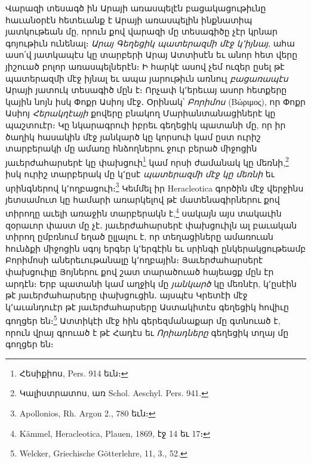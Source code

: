 \documentclass{article}
\begin{document}
{Վարազի տեսագծ ին Արայի առասպելէն բացակացութիւնը հաւանօրէն հետեւանք է Արայի առասպելին ինքնատիպ յատկութեան մը, որուն քով վարազի մը տեսագիծը չէր կրնար գոյութիւն ունենալ։ \emph{Արայ Գեղեցիկ պատերազմի մէջ կ՚իյնայ}, ահա ասո՛վ յատկապէս կը տարբերի Արայ Ատտիսէն եւ անոր հետ վերը յիշուած բոլոր առասպելներէն։ Ի հարկէ ասով չեմ ուզեր ըսել թէ պատերազմի մէջ իյնալ եւ ապա յարութիւն առնուլ \emph{բացառապէս} Արայի յատուկ տեսագիծ մըն է։ Որչափ կ՚երեւայ ասոր հետքերը կային նոյն իսկ Փոքր Ասիոյ մէջ․ Օրինակ՝ \emph{Բորիմոս} (Βώριμος), որ Փոքր Ասիոյ \emph{Հերակղէայի} քովերը բնակող Մարիանտանացիներէ կը պաշտուէր։ Կը նկարագրուի իբրեւ գեղեցիկ պատանի մը, որ իր ծաղիկ հասակին մէջ յանկարծ կը կորսուի կամ ըստ ուրիշ տարբերակի մը ամառը հնձողներու ջուր բերած միջոցին յաւերժահարսերէ կը փախցուի\footnote{Հեսիքիոս, Pers. 914 եւն։} կամ որսի ժամանակ կը մեռնի,\footnote{Կալիստրատոս, առ Schol. Aeschyl. Pers. 941.} իսկ ուրիշ տարբերակ մը կ՚ըսէ \emph{պատերազմի մէջ կը մեռնի} եւ սրինգներով կ՚ողբացուի։\footnote{Apollonios, Rh. Argon 2., 780 եւն։} Կեմմել իր Heracleotica գործին մէջ վերջինս յետսամուտ կը համարի առարկելով թէ մատենագիրներու քով տիրողը աւելի առաջին տարբերակն է,\footnote{Kämmel, Heracleotica, Plauen, 1869, էջ 14 եւ 17։} սակայն այս տակաւին զօրաւոր փաստ մը չէ․ յաւերժահարսերէ փախցուիլն ալ բաւական տիրող ըմբռնում եղած ըլլալու է, որ տեղացիները ամառուան հունձքի միջոցին սգոյ երգեր կ՚երգէին եւ սրինգի ընկերակցութեամբ Բորիմոսի աներեւութանալը կ՚ողբային։ Յաւերժահարսերէ փախցուիլը Յոյներու քով շատ տարածուած հայեացք մըն էր արդէն։ Երբ պատանի կամ աղջիկ մը \emph{յանկարծ} կը մեռնէր, կ՚ըսէին թէ յաւերժահարսերը փախցուցին․ այսպէս Կրետէի մէջ կ՚աւանդուէր թէ յաւերժահարսերը Աստակիտէս գեղեցիկ հովիւը գողցեր են։\footnote{Welcker, Griechische Götterlehre, 11, 3., 52.} Ատտիկէի մէջ հին գերեզմանաքար մը գտնուած է, որուն վրայ գրուած է թէ Հադէս եւ \emph{Որիադները} գեղեցիկ տղայ մը գողցեր են։

}
\end{document}
